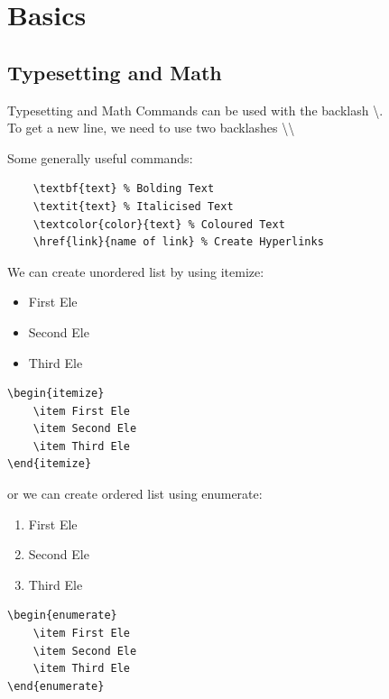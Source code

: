 \section{Basics}
\subsection{Typesetting and Math}
\begin{frame}{Typesetting and Math}
Commands can be used with the backlash \textbackslash. \\
To get a new line, we need to use two backlashes \textbackslash\textbackslash \\

\end{frame}

\begin{frame}[fragile]
Some generally useful commands:
\begin{verbatim}
    \textbf{text} % Bolding Text
    \textit{text} % Italicised Text
    \textcolor{color}{text} % Coloured Text
    \href{link}{name of link} % Create Hyperlinks
\end{verbatim}
\end{frame}

\begin{frame}[fragile]
We can create unordered list by using itemize:
\begin{itemize}
    \item First Ele
    \item Second Ele
    \item Third Ele
\end{itemize}
\begin{verbatim}
\begin{itemize}
    \item First Ele
    \item Second Ele
    \item Third Ele
\end{itemize}
\end{verbatim}

or we can create ordered list using enumerate:
\begin{enumerate}
    \item First Ele
    \item Second Ele
    \item Third Ele
\end{enumerate}

\begin{verbatim}
\begin{enumerate}
    \item First Ele
    \item Second Ele
    \item Third Ele
\end{enumerate}
\end{verbatim}

\end{frame}

